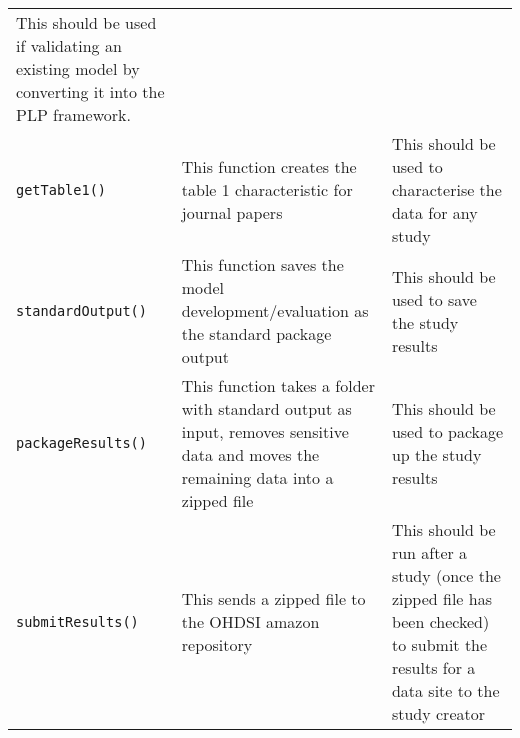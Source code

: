\documentclass[]{article}
\begin{document}
\begin{longtable}[]{@{}lll@{}}
\begin{minipage}[t]{0.10\columnwidth}
This should be used if validating an existing model by converting it
into the PLP framework.\strut
\end{minipage}\tabularnewline
\begin{minipage}[t]{0.11\columnwidth}\raggedright\strut
\texttt{getTable1()}\strut
\end{minipage} & \begin{minipage}[t]{0.18\columnwidth}\raggedright\strut
This function creates the table 1 characteristic for journal
papers\strut
\end{minipage} & \begin{minipage}[t]{0.10\columnwidth}\raggedright\strut
This should be used to characterise the data for any study\strut
\end{minipage}\tabularnewline
\begin{minipage}[t]{0.11\columnwidth}\raggedright\strut
\texttt{standardOutput()}\strut
\end{minipage} & \begin{minipage}[t]{0.18\columnwidth}\raggedright\strut
This function saves the model development/evaluation as the standard
package output\strut
\end{minipage} & \begin{minipage}[t]{0.10\columnwidth}\raggedright\strut
This should be used to save the study results\strut
\end{minipage}\tabularnewline
\begin{minipage}[t]{0.11\columnwidth}\raggedright\strut
\texttt{packageResults()}\strut
\end{minipage} & \begin{minipage}[t]{0.18\columnwidth}\raggedright\strut
This function takes a folder with standard output as input, removes
sensitive data and moves the remaining data into a zipped file\strut
\end{minipage} & \begin{minipage}[t]{0.10\columnwidth}\raggedright\strut
This should be used to package up the study results\strut
\end{minipage}\tabularnewline
\begin{minipage}[t]{0.11\columnwidth}\raggedright\strut
\texttt{submitResults()}\strut
\end{minipage} & \begin{minipage}[t]{0.18\columnwidth}\raggedright\strut
This sends a zipped file to the OHDSI amazon repository\strut
\end{minipage} & \begin{minipage}[t]{0.10\columnwidth}\raggedright\strut
This should be run after a study (once the zipped file has been checked)
to submit the results for a data site to the study creator\strut
\end{minipage}\tabularnewline
\bottomrule
\end{longtable}
\end{document}
